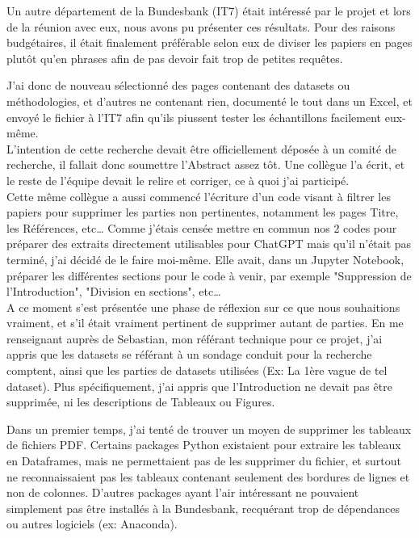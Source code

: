 Un autre département de la Bundesbank (IT7) était intéressé par le projet et lors de la réunion avec eux, nous avons pu présenter ces résultats.
Pour des raisons budgétaires, il était finalement préférable selon eux de diviser les papiers en pages plutôt qu'en phrases afin de pas devoir fait trop de petites requêtes.

J'ai donc de nouveau sélectionné des pages contenant des datasets ou méthodologies, et d'autres ne contenant rien, documenté le tout dans un Excel, et envoyé le fichier à l'IT7 afin qu'ils piussent tester les échantillons facilement eux-même.
\\

L'intention de cette recherche devait être officiellement déposée à un comité de recherche, il fallait donc soumettre l'Abstract assez tôt. 
Une collègue l'a écrit, et le reste de l'équipe devait le relire et corriger, ce à quoi j'ai participé.
\\

Cette même collègue a aussi commencé l'écriture d'un code visant à filtrer les papiers pour supprimer les parties non pertinentes, notamment les pages Titre, les Références, etc\dots
Comme j'étais censée mettre en commun nos 2 codes pour préparer des extraits directement utilisables pour ChatGPT mais qu'il n'était pas terminé, j'ai décidé de le faire moi-même.
Elle avait, dans un Jupyter Notebook, préparer les différentes sections pour le code à venir, par exemple "Suppression de l'Introduction", "Division en sections", etc\dots
\\

A ce moment s'est présentée une phase de réflexion sur ce que nous souhaitions vraiment, et s'il était vraiment pertinent de supprimer autant de parties.
En me renseignant auprès de Sebastian, mon référant technique pour ce projet, j'ai appris que les datasets se référant à un sondage conduit pour la recherche comptent, ainsi que les parties de datasets utilisées (Ex: La 1ère vague de tel dataset).
Plus spécifiquement, j'ai appris que l'Introduction ne devait pas être supprimée, ni les descriptions de Tableaux ou Figures.

Dans un premier temps, j'ai tenté de trouver un moyen de supprimer les tableaux de fichiers PDF.
Certains packages Python existaient pour extraire les tableaux en Dataframes, mais ne permettaient pas de les supprimer du fichier, et surtout ne reconnaissaient pas les tableaux contenant seulement des bordures de lignes et non de colonnes.
D'autres packages ayant l'air intéressant ne pouvaient simplement pas être installés à la Bundesbank, recquérant trop de dépendances ou autres logiciels (ex: Anaconda).

